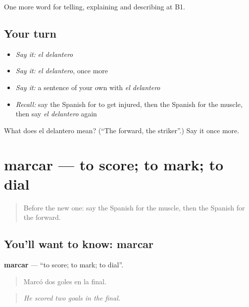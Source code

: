 \begin{grammarlens}[title={What you've built}]
One more word for telling, explaining and describing at B1.
\end{grammarlens}

\subsection*{Your turn}
\begin{itemize}
\raggedright
  \item \emph{Say it:} \emph{el delantero}
  \item \emph{Say it:} \emph{el delantero}, once more
  \item \emph{Say it:} a sentence of your own with \emph{el delantero}
  \item \emph{Recall:} say the Spanish for to get injured, then the Spanish for the muscle, then say \emph{el delantero} again
\end{itemize}

\begin{tcolorbox}[breakable,colback=teal!4,colframe=teal!35!black,title={Before you move on}]
What does el delantero mean? (\textquotedblleft{}The forward, the striker\textquotedblright{}.) Say it once more.
\end{tcolorbox}
\section[marcar]{marcar — to score; to mark; to dial}

\label{lesson:ES-C756-marcar}



\begin{quote}
Before the new one: say the Spanish for the muscle, then the Spanish for the forward.
\end{quote}

\subsection*{You'll want to know: marcar}
\textbf{marcar} — \textquotedblleft{}to score; to mark; to dial\textquotedblright{}.

\begin{quote}
Marcó dos goles en la final.
\end{quote}

\begin{quote}
\emph{He scored two goals in the final.}
\end{quote}

